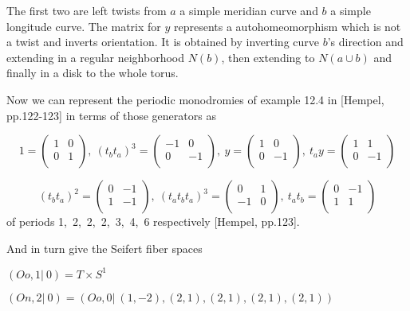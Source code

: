\documentclass[12pt]{article}
\begin{document}
The first two are left twists from $a$ a simple meridian curve and $b$ a simple longitude curve. 
The matrix for $y$ represents a autohomeomorphism which is not a twist and inverts orientation.
It is obtained by inverting curve $b$'s direction and extending in a 
regular neighborhood $N(b)$, then extending to $N(a\cup b)$ 
and finally in a disk to the whole torus.

Now we can represent the periodic monodromies of example 12.4 in [Hempel, pp.122-123] in terms of those
generators as

$$1=
\left(\begin{array}{cc}
1 & 0 \\
0 & 1 \\  
\end{array}\right)
,\ (t_bt_a)^3=
\left(\begin{array}{cc}
-1 & 0 \\
0 & -1 \\  
\end{array}\right)
,\ y=
\left(\begin{array}{cc}
1 & 0 \\
0 & -1 \\  
\end{array}\right)
,\ t_ay=
\left(\begin{array}{cc}
1 & 1 \\
0 & -1 \\  
\end{array}\right)
$$

$$(t_bt_a)^2=
\left(\begin{array}{cc}
0 & -1 \\
1 & -1 \\  
\end{array}\right)
,\ (t_at_bt_a)^3=
\left(\begin{array}{cc}
0 & 1 \\
-1 & 0 \\  
\end{array}\right)
,\ t_at_b=
\left(\begin{array}{cc}
0 & -1 \\
1 & 1 \\  
\end{array}\right)
$$
of periods 1,\ 2,\ 2,\ 2,\ 3,\ 4,\ 6 respectively [Hempel, pp.123].

\bigskip

And in turn give the Seifert fiber spaces
\bigskip

$(Oo,1|\ 0)=T\times S^1$

$(On,2|\ 0)=(Oo,0|\ (1,-2),(2,1),(2,1),(2,1),(2,1))$
\end{document}

